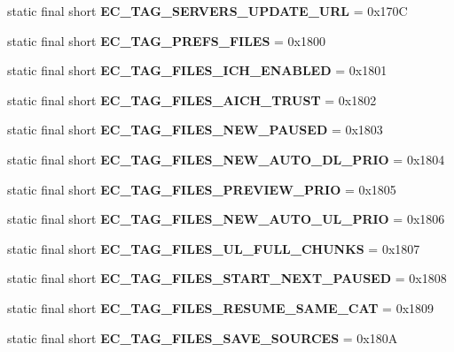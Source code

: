 \begin{DoxyCompactItemize}
\item 
static final short {\bfseries EC\_\-TAG\_\-SERVERS\_\-UPDATE\_\-URL} = 0x170C\label{interfaceECCodes_a372e7aa6fa8cfa98a797e635c11ef959}

\item 
static final short {\bfseries EC\_\-TAG\_\-PREFS\_\-FILES} = 0x1800\label{interfaceECCodes_aed4170ac566aa44a7fcd34d10b22e831}

\item 
static final short {\bfseries EC\_\-TAG\_\-FILES\_\-ICH\_\-ENABLED} = 0x1801\label{interfaceECCodes_a9756c7d375ec4b9d8e7b12e263c1e82a}

\item 
static final short {\bfseries EC\_\-TAG\_\-FILES\_\-AICH\_\-TRUST} = 0x1802\label{interfaceECCodes_a8be79886790812557481ec5eb6488cb9}

\item 
static final short {\bfseries EC\_\-TAG\_\-FILES\_\-NEW\_\-PAUSED} = 0x1803\label{interfaceECCodes_a696e967810879a86e6291c3c5b50efb7}

\item 
static final short {\bfseries EC\_\-TAG\_\-FILES\_\-NEW\_\-AUTO\_\-DL\_\-PRIO} = 0x1804\label{interfaceECCodes_aedcb6aed00da147ddc26954c019377e9}

\item 
static final short {\bfseries EC\_\-TAG\_\-FILES\_\-PREVIEW\_\-PRIO} = 0x1805\label{interfaceECCodes_aa10eccd7180eed256c2e74f100365430}

\item 
static final short {\bfseries EC\_\-TAG\_\-FILES\_\-NEW\_\-AUTO\_\-UL\_\-PRIO} = 0x1806\label{interfaceECCodes_a30f5f8eea62ef3cfc4c37a34b6a2cee7}

\item 
static final short {\bfseries EC\_\-TAG\_\-FILES\_\-UL\_\-FULL\_\-CHUNKS} = 0x1807\label{interfaceECCodes_a36ed140cf59bdd8a735336feb3680315}

\item 
static final short {\bfseries EC\_\-TAG\_\-FILES\_\-START\_\-NEXT\_\-PAUSED} = 0x1808\label{interfaceECCodes_a24f826913ef9f009c2f97c61ffbf7326}

\item 
static final short {\bfseries EC\_\-TAG\_\-FILES\_\-RESUME\_\-SAME\_\-CAT} = 0x1809\label{interfaceECCodes_aeaf60c511c5301ea0e72c33bb3661b95}

\item 
static final short {\bfseries EC\_\-TAG\_\-FILES\_\-SAVE\_\-SOURCES} = 0x180A\label{interfaceECCodes_ada831d1a4b53d4179e54a2e1b39ebdb0}


\end{DoxyCompactItemize}
